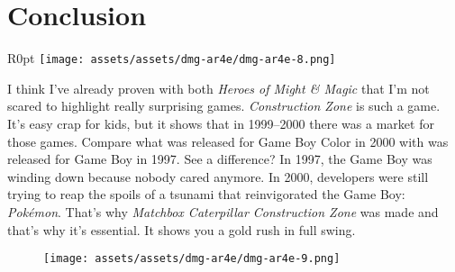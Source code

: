 \documentclass{book}
\begin{document}
\FloatBarrier\needspace{10mm}\section*{Conclusion}\nopagebreak[4]

\begin{wrapfigure}{R}{0pt} \texttt{[image: assets/assets/dmg-ar4e/dmg-ar4e-8.png]}\end{wrapfigure}
I think I’ve already proven with both \emph{Heroes of Might \& Magic} that I’m not scared to highlight really surprising games. \emph{Construction Zone} is such a game. It’s easy crap for kids, but it shows that in 1999–2000 there was a market for those games. Compare what was released for Game Boy Color in 2000 with was released for Game Boy in 1997. See a difference? In 1997, the Game Boy was winding down because nobody cared anymore. In 2000, developers were still trying to reap the spoils of a tsunami that reinvigorated the Game Boy: \emph{Pokémon}. That’s why \emph{Matchbox Caterpillar Construction Zone} was made and that’s why it’s essential. It shows you a gold rush in full swing.

\begin{figure}[hbt]
\vskip 10pt
\centering \texttt{[image: assets/assets/dmg-ar4e/dmg-ar4e-9.png]}
\vskip 6pt
\end{figure}
\end{document}
